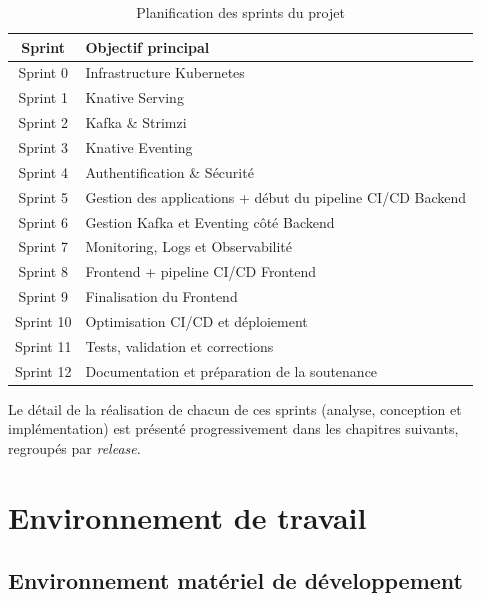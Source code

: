    \begin{table}[H]
    \begin{center}
    \begin{tabular}{|c{2cm}|l{11cm}|}
    \hline
    \textbf{Sprint} & \textbf{Objectif principal} \\
    \hline
    Sprint 0  & Infrastructure Kubernetes \\
    \hline
    Sprint 1  & Knative Serving \\
    \hline
    Sprint 2  & Kafka \& Strimzi \\
    \hline
    Sprint 3  & Knative Eventing \\
    \hline
    Sprint 4  & Authentification \& Sécurité \\
    \hline
    Sprint 5  & Gestion des applications + début du pipeline CI/CD Backend \\
    \hline
    Sprint 6  & Gestion Kafka et Eventing côté Backend \\
    \hline
    Sprint 7  & Monitoring, Logs et Observabilité \\
    \hline
    Sprint 8  & Frontend + pipeline CI/CD Frontend \\
    \hline
    Sprint 9  & Finalisation du Frontend \\
    \hline
    Sprint 10 & Optimisation CI/CD et déploiement \\
    \hline
    Sprint 11 & Tests, validation et corrections \\
    \hline
    Sprint 12 & Documentation et préparation de la soutenance \\
    \hline
    \end{tabular}
    \caption{Planification des sprints du projet}
    \label{tab:sprints}
    \end{center}
    \end{table}
    
    Le détail de la réalisation de chacun de ces sprints (analyse, conception et implémentation) est présenté progressivement dans les chapitres suivants, regroupés par \textit{release}.
    
    
    \section{Environnement de travail}
    
    \subsection{Environnement matériel de développement}
    \label{sec:env-materiel}

